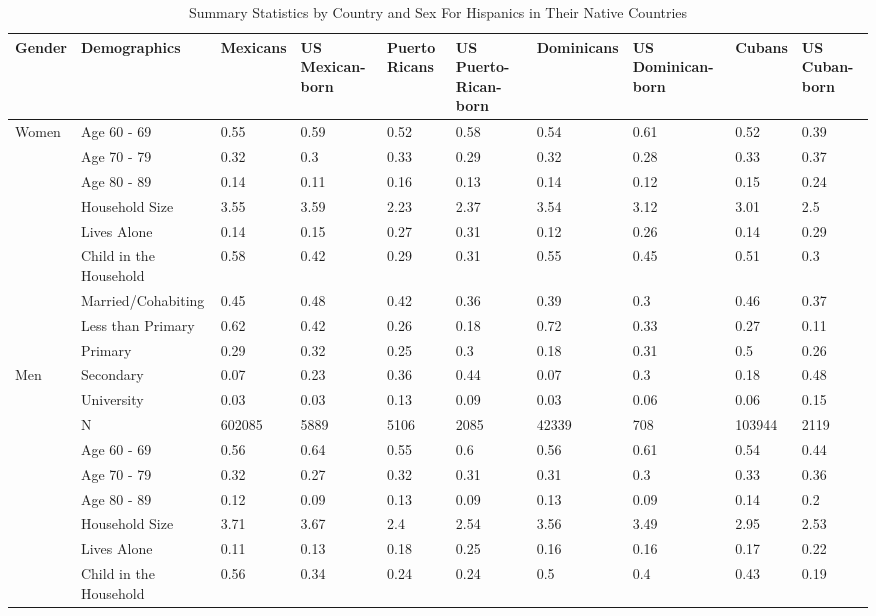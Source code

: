 \begin{table}[ht]
\centering
\caption{Summary Statistics by Country and Sex For Hispanics in Their Native Countries} 
\begin{tabular}{l|l|llllllll}
  \hline
Gender & Demographics & Mexicans & US Mexican-born & Puerto Ricans & US Puerto-Rican-born & Dominicans & US Dominican-born & Cubans & US Cuban-born \\ 
  \hline
Women & Age 60 - 69 & 0.55 & 0.59 & 0.52 & 0.58 & 0.54 & 0.61 & 0.52 & 0.39 \\ 
   & Age 70 - 79 & 0.32 & 0.3 & 0.33 & 0.29 & 0.32 & 0.28 & 0.33 & 0.37 \\ 
   & Age 80 - 89 & 0.14 & 0.11 & 0.16 & 0.13 & 0.14 & 0.12 & 0.15 & 0.24 \\ 
   & Household Size & 3.55 & 3.59 & 2.23 & 2.37 & 3.54 & 3.12 & 3.01 & 2.5 \\ 
   & Lives Alone & 0.14 & 0.15 & 0.27 & 0.31 & 0.12 & 0.26 & 0.14 & 0.29 \\ 
   & Child in the Household & 0.58 & 0.42 & 0.29 & 0.31 & 0.55 & 0.45 & 0.51 & 0.3 \\ 
   & Married/Cohabiting & 0.45 & 0.48 & 0.42 & 0.36 & 0.39 & 0.3 & 0.46 & 0.37 \\ 
   & Less than Primary & 0.62 & 0.42 & 0.26 & 0.18 & 0.72 & 0.33 & 0.27 & 0.11 \\ 
   & Primary & 0.29 & 0.32 & 0.25 & 0.3 & 0.18 & 0.31 & 0.5 & 0.26 \\ 
  Men & Secondary & 0.07 & 0.23 & 0.36 & 0.44 & 0.07 & 0.3 & 0.18 & 0.48 \\ 
   & University & 0.03 & 0.03 & 0.13 & 0.09 & 0.03 & 0.06 & 0.06 & 0.15 \\ 
   & N & 602085 & 5889 & 5106 & 2085 & 42339 & 708 & 103944 & 2119 \\ 
   & Age 60 - 69 & 0.56 & 0.64 & 0.55 & 0.6 & 0.56 & 0.61 & 0.54 & 0.44 \\ 
   & Age 70 - 79 & 0.32 & 0.27 & 0.32 & 0.31 & 0.31 & 0.3 & 0.33 & 0.36 \\ 
   & Age 80 - 89 & 0.12 & 0.09 & 0.13 & 0.09 & 0.13 & 0.09 & 0.14 & 0.2 \\ 
   & Household Size & 3.71 & 3.67 & 2.4 & 2.54 & 3.56 & 3.49 & 2.95 & 2.53 \\ 
   & Lives Alone & 0.11 & 0.13 & 0.18 & 0.25 & 0.16 & 0.16 & 0.17 & 0.22 \\ 
   & Child in the Household & 0.56 & 0.34 & 0.24 & 0.24 & 0.5 & 0.4 & 0.43 & 0.19 \\ 

\end{tabular}
\end{table}
